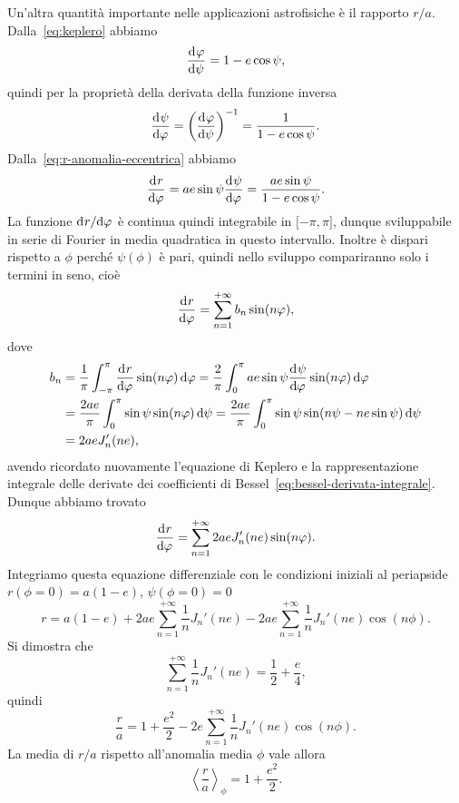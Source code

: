 Un'altra quantità importante nelle applicazioni astrofisiche è il rapporto
$r/a$. Dalla~\eqref{eq:keplero} abbiamo
\begin{equation}
  \frac{{\mathop{}\!\mathrm{d}^{}}\varphi}{\mathop{}\!\mathrm{d} {\psi}^{}} = 1 -e\cos\psi,
\end{equation}
quindi per la proprietà della derivata della funzione inversa
\begin{equation}
  \frac{{\mathop{}\!\mathrm{d}^{}}\psi}{\mathop{}\!\mathrm{d} {\varphi}^{}} =
  \left(
    \frac{{\mathop{}\!\mathrm{d}^{}}\varphi}{\mathop{}\!\mathrm{d} {\psi}^{}}
  \right)^{-1} = \frac{1}{1 - e\cos\psi}.
\end{equation}
Dalla~\eqref{eq:r-anomalia-eccentrica} abbiamo
\begin{equation}
  \frac{{\mathop{}\!\mathrm{d}^{}}r}{\mathop{}\!\mathrm{d} {\varphi}^{}} = ae\sin\psi\frac{{\mathop{}\!\mathrm{d}^{}}\psi}{\mathop{}\!\mathrm{d} {\varphi}^{}} = \frac{ae\sin\psi}{1-e\cos\psi}.
\end{equation}
La funzione $\mathrm{d}^{}r / \mathrm{d} {\varphi}^{}$ è continua quindi integrabile in $\mathopen{[}-\pi,
\pi\mathclose{]}$, dunque sviluppabile in serie di Fourier in media quadratica
in questo intervallo. Inoltre è dispari rispetto a $\phi$ perché $\psi(\phi)$ è
pari, quindi nello sviluppo compariranno solo i termini in seno, cioè
\begin{equation}
  \frac{{\mathop{}\!\mathrm{d}^{}}r}{\mathop{}\!\mathrm{d} {\varphi}^{}} = \sum_{n=1}^{+\infty}b_n\sin(n\varphi),
\end{equation}
dove
\begin{equation}
  \begin{split}
    b_n &= \frac{1}{\pi}\int_{-\pi}^\pi \toder{r}{\phi}\sin(n\phi)\dd\phi =
    \frac{2}{\pi}\int_0^\pi ae\sin\psi\toder{\psi}{\phi}\sin(n\phi)\dd\phi \\
    &= \frac{2ae}{\pi}\int_0^\pi \sin\psi\sin(n\phi)\dd\psi = \frac{2ae}{\pi}
    \int_0^\pi \sin\psi\sin(n\psi - ne\sin\psi)\dd\psi \\
    &= 2aeJ_n'(ne),
  \end{split}
\end{equation}
avendo ricordato nuovamente l'equazione di Keplero e la rappresentazione
integrale delle derivate dei coefficienti di
Bessel~\eqref{eq:bessel-derivata-integrale}. Dunque abbiamo trovato
\begin{equation}
  \frac{{\mathop{}\!\mathrm{d}^{}}r}{\mathop{}\!\mathrm{d} {\varphi}^{}} = \sum_{n=1}^{+\infty} 2aeJ_n'(ne)\sin(n\varphi).
\end{equation}
Integriamo questa equazione differenziale con le condizioni iniziali al
periapside $r(\phi=0) = a(1-e)$, $\psi(\phi=0)=0$
\begin{equation}
  r = a(1-e) + 2ae\sum_{n=1}^{+\infty}\frac{1}{n}J_n'(ne) -
  2ae\sum_{n=1}^{+\infty}\frac{1}{n}J_n'(ne)\cos(n\phi).
\end{equation}
Si dimostra che
\begin{equation}
  \sum_{n=1}^{+\infty}\frac{1}{n}J_n'(ne) = \frac{1}{2} + \frac{e}{4},
\end{equation}
quindi
\begin{equation}
  \label{eq:r-su-a-bessel}
  \frac{r}{a} = 1 + \frac{e^2}{2} - 2e \sum_{n=1}^{+\infty} \frac{1}{n} J_n'(ne)
  \cos(n\phi).
\end{equation}
La media di $r/a$ rispetto all'anomalia media $\phi$ vale allora
\begin{equation}
  \left\langle \frac{r}{a} \right\rangle_\phi = 1 + \frac{e^2}{2}.
\end{equation}

